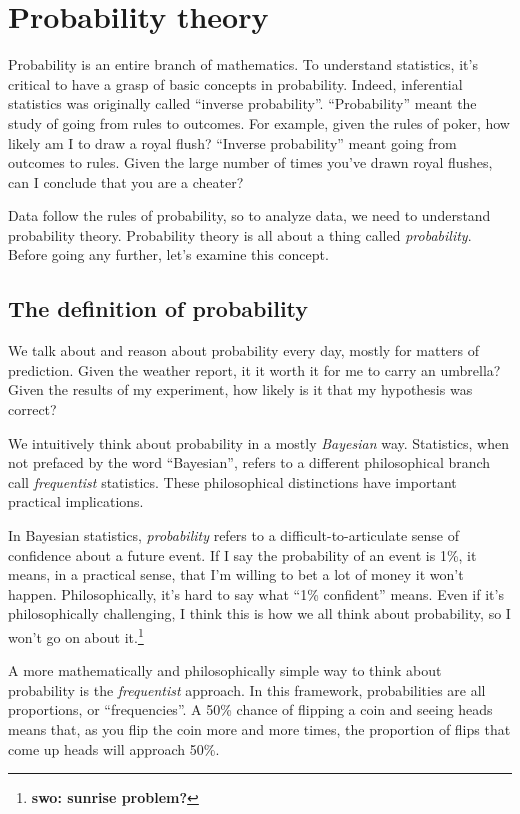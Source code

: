 
\chapter{Probability theory}

Probability is an entire branch of mathematics. To understand statistics, it's
critical to have a grasp of basic concepts in probability. Indeed, inferential
statistics was originally called ``inverse probability''. ``Probability''
meant the study of going from rules to outcomes. For example, given the rules of
poker, how likely am I to draw a royal flush? ``Inverse probability''
meant going from outcomes to rules. Given the large number of times
you've drawn royal flushes, can I conclude that you are a cheater?

Data follow the rules of probability, so to analyze data, we need to
understand probability theory. Probability theory is all about a thing called
\emph{probability}. Before going any further, let's examine this concept.

\section{The definition of probability}

We talk about and reason about probability every day, mostly for matters of
prediction. Given the weather report, it it worth it for me to carry an
umbrella? Given the results
of my experiment, how likely is it that my hypothesis was correct?

We intuitively think about probability in a mostly
\emph{Bayesian} way. Statistics, when not prefaced by the word
``Bayesian'', refers to a different philosophical branch call
\emph{frequentist} statistics. These philosophical distinctions have
important practical implications.

In Bayesian statistics, \emph{probability} refers to a difficult-to-articulate
sense of confidence about a future event. If I say the
probability of an event is 1\%, it means, in a practical sense, that I'm willing to bet a lot of money it
won't happen. Philosophically, it's hard to say what ``1\%
confident'' means. Even if it's philosophically challenging, I think this is
how we all think about probability, so I won't go on about it.\footnote{\textbf{swo: sunrise problem?}}

A more mathematically and philosophically simple way to think about
probability is the \emph{frequentist} approach. In this framework, probabilities are all
proportions, or ``frequencies''.
A 50\% chance of
flipping a coin and seeing heads means that, as you flip the coin more and
more times, the proportion of flips that come up heads will approach 50\%.

